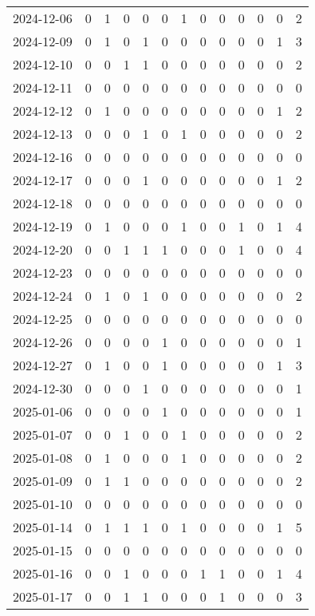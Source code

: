 \documentclass[dvipdfmx,oneside]{article}
\begin{document}
\begin{longtable}{lcccccccccccc}
2024-12-06 & 0 & 1 & 0 & 0 & 0 & 1 & 0 & 0 & 0 & 0 & 0 & 2 \\
2024-12-09 & 0 & 1 & 0 & 1 & 0 & 0 & 0 & 0 & 0 & 0 & 1 & 3 \\
2024-12-10 & 0 & 0 & 1 & 1 & 0 & 0 & 0 & 0 & 0 & 0 & 0 & 2 \\
2024-12-11 & 0 & 0 & 0 & 0 & 0 & 0 & 0 & 0 & 0 & 0 & 0 & 0 \\
2024-12-12 & 0 & 1 & 0 & 0 & 0 & 0 & 0 & 0 & 0 & 0 & 1 & 2 \\
2024-12-13 & 0 & 0 & 0 & 1 & 0 & 1 & 0 & 0 & 0 & 0 & 0 & 2 \\
2024-12-16 & 0 & 0 & 0 & 0 & 0 & 0 & 0 & 0 & 0 & 0 & 0 & 0 \\
2024-12-17 & 0 & 0 & 0 & 1 & 0 & 0 & 0 & 0 & 0 & 0 & 1 & 2 \\
2024-12-18 & 0 & 0 & 0 & 0 & 0 & 0 & 0 & 0 & 0 & 0 & 0 & 0 \\
2024-12-19 & 0 & 1 & 0 & 0 & 0 & 1 & 0 & 0 & 1 & 0 & 1 & 4 \\
2024-12-20 & 0 & 0 & 1 & 1 & 1 & 0 & 0 & 0 & 1 & 0 & 0 & 4 \\
2024-12-23 & 0 & 0 & 0 & 0 & 0 & 0 & 0 & 0 & 0 & 0 & 0 & 0 \\
2024-12-24 & 0 & 1 & 0 & 1 & 0 & 0 & 0 & 0 & 0 & 0 & 0 & 2 \\
2024-12-25 & 0 & 0 & 0 & 0 & 0 & 0 & 0 & 0 & 0 & 0 & 0 & 0 \\
2024-12-26 & 0 & 0 & 0 & 0 & 1 & 0 & 0 & 0 & 0 & 0 & 0 & 1 \\
2024-12-27 & 0 & 1 & 0 & 0 & 1 & 0 & 0 & 0 & 0 & 0 & 1 & 3 \\
2024-12-30 & 0 & 0 & 0 & 1 & 0 & 0 & 0 & 0 & 0 & 0 & 0 & 1 \\
2025-01-06 & 0 & 0 & 0 & 0 & 1 & 0 & 0 & 0 & 0 & 0 & 0 & 1 \\
2025-01-07 & 0 & 0 & 1 & 0 & 0 & 1 & 0 & 0 & 0 & 0 & 0 & 2 \\
2025-01-08 & 0 & 1 & 0 & 0 & 0 & 1 & 0 & 0 & 0 & 0 & 0 & 2 \\
2025-01-09 & 0 & 1 & 1 & 0 & 0 & 0 & 0 & 0 & 0 & 0 & 0 & 2 \\
2025-01-10 & 0 & 0 & 0 & 0 & 0 & 0 & 0 & 0 & 0 & 0 & 0 & 0 \\
2025-01-14 & 0 & 1 & 1 & 1 & 0 & 1 & 0 & 0 & 0 & 0 & 1 & 5 \\
2025-01-15 & 0 & 0 & 0 & 0 & 0 & 0 & 0 & 0 & 0 & 0 & 0 & 0 \\
2025-01-16 & 0 & 0 & 1 & 0 & 0 & 0 & 1 & 1 & 0 & 0 & 1 & 4 \\
2025-01-17 & 0 & 0 & 1 & 1 & 0 & 0 & 0 & 1 & 0 & 0 & 0 & 3 \\

\end{longtable}
\end{document}
